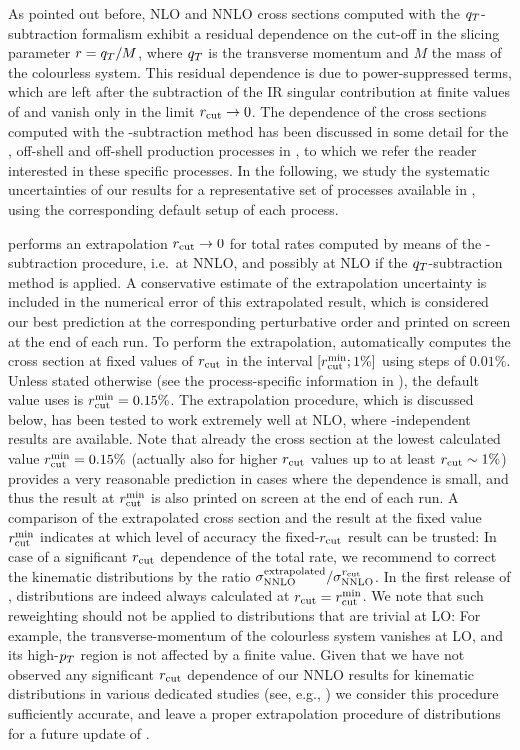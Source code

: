 \documentclass[english,11pt]{article}
\begin{document}
As pointed out before, NLO and NNLO 
cross sections computed with the $q_T$-subtraction formalism
exhibit a residual dependence on the cut-off \rcut{} in the slicing parameter $r=q_T/M$, where 
$q_T$ is the transverse momentum and $M$ the mass of the colourless system.
This residual dependence is due to power-suppressed terms, which are left
after the subtraction of the IR singular contribution at finite 
values of \rcut{} and vanish only in the limit $r_{\mathrm{cut}}{}\rightarrow 0$.
The \rcut{} dependence of the cross sections computed with the \qt{}-subtraction method has been discussed in some detail for 
the \wgamma{}, off-shell \ww{} and off-shell \wz{} production processes in , to which we refer the reader interested in these specific processes.
In the following, we study the systematic uncertainties of our results for a representative set of processes 
available in \Matrix{}, using the corresponding default setup of each process.


\Matrix{} performs an extrapolation $r_{\mathrm{cut}}{}\rightarrow 0$ 
for total rates computed by means of the \qt{}-subtraction procedure, i.e.\ at NNLO, and 
possibly at NLO if the $q_T$-subtraction method is applied. 
A conservative estimate of the extrapolation uncertainty is included in the numerical error of 
this extrapolated result, which is considered our best prediction at the corresponding 
perturbative order and printed on screen at the end of each run.
To perform the extrapolation, \Matrix{} automatically computes the cross section at fixed values of $r_{\mathrm{cut}}$ in 
the interval $[r_{\mathrm{cut}}^\mathrm{min};1\%]$ using steps of $0.01\%$. 
Unless stated otherwise (see the process-specific information in ),  
the default value \Matrix{} uses is $r_{\mathrm{cut}}^\mathrm{min}{}=0.15\%$.
The extrapolation procedure, which is discussed below, has been tested to work extremely well at NLO, where \rcut{}-independent results 
are available. Note that already the cross section at the lowest calculated value 
$r_{\mathrm{cut}}^\mathrm{min}{}=0.15\%$ (actually also for higher $r_{\mathrm{cut}}$ values up to at least $r_{\mathrm{cut}}\sim1\%$) 
provides a very reasonable prediction in cases where the \rcut{} dependence is small, 
and thus the result at $r_{\mathrm{cut}}^\mathrm{min}{}$ is also printed on screen at the end of each run.
A comparison of the extrapolated cross section and the result at the fixed value 
$r_{\mathrm{cut}}^\mathrm{min}$ indicates at which level of accuracy the fixed-$r_{\mathrm{cut}}$ result can be trusted:
In case of a significant $r_{\mathrm{cut}}$ dependence of the total rate, we recommend to correct the 
kinematic distributions by the ratio $\sigma^\textrm{extrapolated}_\textrm{NNLO}/\sigma^{r_{\rm cut}}_\textrm{NNLO}$. In the first release of \Matrix{},
distributions are indeed always calculated at $r_{\mathrm{cut}}=r_{\mathrm{cut}}^\mathrm{min}$. We note that such reweighting should not 
be applied to distributions that are trivial at LO: For example, the transverse-momentum 
of the colourless system vanishes at LO, and its high-$p_T$ region is not affected 
by a finite \rcut{} value.
Given that we have not observed any significant $r_{\mathrm{cut}}$ dependence of our NNLO results for kinematic distributions 
in various dedicated studies (see, e.g., ) we consider this 
procedure sufficiently accurate, and leave a proper extrapolation procedure of 
distributions for a future update of \Matrix{}.
\end{document}
